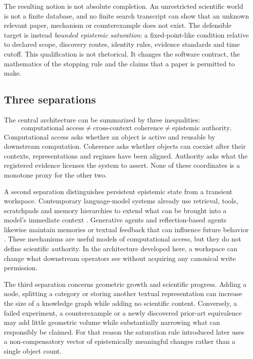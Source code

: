 The resulting notion is not absolute completion. An unrestricted scientific world is not a finite database, and no finite search transcript can show that an unknown relevant paper, mechanism or counterexample does not exist. The defensible target is instead \emph{bounded epistemic saturation}: a fixed-point-like condition relative to declared scope, discovery routes, identity rules, evidence standards and time cutoff. This qualification is not rhetorical. It changes the software contract, the mathematics of the stopping rule and the claims that a paper is permitted to make.

\subsection{Three separations}

The central architecture can be summarized by three inequalities:
\[
\boxed{\text{computational access}\neq\text{cross-context coherence}\neq\text{epistemic authority}.}
\]
Computational access asks whether an object is active and reusable by downstream computation. Coherence asks whether objects can coexist after their contexts, representations and regimes have been aligned. Authority asks what the registered evidence licenses the system to assert. None of these coordinates is a monotone proxy for the other two.

A second separation distinguishes persistent epistemic state from a transient workspace. Contemporary language-model systems already use retrieval, tools, scratchpads and memory hierarchies to extend what can be brought into a model's immediate context \cite{lewis2020,yao2023,schick2023,packer2023,mialon2023}. Generative agents and reflection-based agents likewise maintain memories or textual feedback that can influence future behavior \cite{park2023,shinn2023}. These mechanisms are useful models of computational access, but they do not define scientific authority. In the architecture developed here, a workspace can change what downstream operators see without acquiring any canonical write permission.

The third separation concerns geometric growth and scientific progress. Adding a node, splitting a category or storing another textual representation can increase the size of a knowledge graph while adding no scientific content. Conversely, a failed experiment, a counterexample or a newly discovered prior-art equivalence may add little geometric volume while substantially narrowing what can responsibly be claimed. For that reason the saturation rule introduced later uses a non-compensatory vector of epistemically meaningful changes rather than a single object count.


